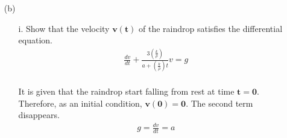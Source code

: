 \documentclass[]{article}
\begin{document}
{\begin{enumerate}
\begin{enumerate}
\begin{equation*}
\begin{split}
								 k(4\pi r^2) &= \frac{dr}{dt}(\rho 4 \pi r^2) \\
								 \frac{dr}{dt} &= \frac{k}{\rho} = (negative) \, constant
							\end{split}
						\end{equation*}
					For later parts, it is beneficial to find how the radius of the raindrop changes with time.
						\begin{equation*}
							\begin{split}
								\int_{a}^{r} \, dr &= \int_{0}^{t} \frac{k}{\rho} \, dt \\
								r - a &= \frac{k}{\rho} t \\
								r(t) &= a + \frac{k}{\rho} t \\
							\end{split}
						\end{equation*}
					\item[ii.] If $\bm{a=3.05 \, mm}$ and the radius is 2.14 mm 10 seconds after the raindrop falls from a cloud, determine the time  which the raindrop has evaporated completely.
						\begin{equation*}
							\begin{split}
								\frac{2.14 - 3.05}{10 - 0} &= -0.091 \\\\
								\frac{0 - 3.05}{t} &= -0.091 \\
								t &= \frac{-3.05}{-0.091} = 33.5 \, s 
							\end{split}
						\end{equation*}
				\end{enumerate}
			\item[(b)]
				\begin{enumerate}
					\item[i.] Show that the velocity $\bm{v(t)}$ of the raindrop satisfies the differential equation.
					\begin{equation*}
						\begin{split}
							\frac{dv}{dt} + \frac{3 \left( \frac{k}{\rho} \right)}{a + \left( \frac{k}{\rho} \right)t}v = g
						\end{split}
					\end{equation*}
						\paragraph{} It is given that the raindrop start falling from rest at time $\bm{t=0}$. Therefore, as an initial condition, $\bm{v(0) = 0}$. The second term disappears.
						\begin{equation*}
							\begin{split}
								 g = \frac{dv}{dt} = a
							\end{split}
						\end{equation*}

\end{enumerate}
\end{enumerate}}
\end{document}
